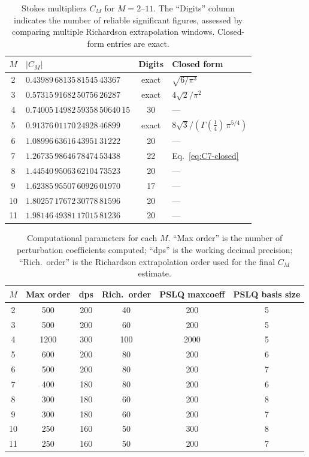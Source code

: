 \documentclass[12pt,a4paper]{article}
\numberwithin{equation}{section}
\theoremstyle{plain}
\theoremstyle{definition}
\theoremstyle{remark}
\begin{document}
\begin{table}[ht]
\centering
\caption{Stokes multipliers $C_M$ for $M = 2$--$11$. The ``Digits'' column
indicates the number of reliable significant figures, assessed by comparing
multiple Richardson extrapolation windows. Closed-form entries are exact.}
\label{tab:CM}
\begin{tabular}{@{}clcl@{}}
\toprule
$M$ & $|C_M|$ & Digits & Closed form \\
\midrule
 2 & $0.43989\,68135\,81545\,43367$ & exact & $\sqrt{6/\pi^3}$ \\[2pt]
 3 & $0.57315\,91682\,50756\,26287$ & exact & $4\sqrt{2}/\pi^2$ \\[2pt]
 4 & $0.74005\,14982\,59358\,50640\,15$ & 30 & --- \\[2pt]
 5 & $0.91376\,01170\,24928\,46899$ & exact & $8\sqrt{3}/(\Gamma(\frac{1}{4})\,\pi^{5/4})$ \\[2pt]
 6 & $1.08996\,63616\,43951\,31222$ & 20 & --- \\[2pt]
 7 & $1.26735\,98646\,78474\,53438$ & 22 & Eq.~\eqref{eq:C7-closed} \\[2pt]
 8 & $1.44540\,95063\,62104\,73523$ & 20 & --- \\[2pt]
 9 & $1.62385\,95507\,60926\,01970$ & 17 & --- \\[2pt]
10 & $1.80257\,17672\,30778\,81596$ & 20 & --- \\[2pt]
11 & $1.98146\,49381\,17015\,81236$ & 20 & --- \\
\bottomrule
\end{tabular}
\end{table}

\begin{table}[ht]
\centering
\caption{Computational parameters for each $M$. ``Max order'' is the number
of perturbation coefficients computed; ``dps'' is the working decimal
precision; ``Rich.\ order'' is the Richardson extrapolation order used for
the final $C_M$ estimate.}
\label{tab:params}
\begin{tabular}{@{}cccccc@{}}
\toprule
$M$ & Max order & dps & Rich.\ order & PSLQ maxcoeff & PSLQ basis size \\
\midrule
 2 &  500 & 200 & 40  & 200  & 5 \\
 3 &  500 & 200 & 60  & 200  & 5 \\
 4 & 1200 & 300 & 100 & 2000 & 5 \\
 5 &  600 & 200 & 80  & 200  & 6 \\
 6 &  500 & 200 & 80  & 200  & 7 \\
 7 &  400 & 180 & 80  & 200  & 6 \\
 8 &  300 & 180 & 60  & 200  & 8 \\
 9 &  300 & 180 & 60  & 200  & 7 \\
10 &  250 & 160 & 50  & 300  & 8 \\
11 &  250 & 160 & 50  & 200  & 7 \\
\bottomrule
\end{tabular}
\end{table}
\end{document}
